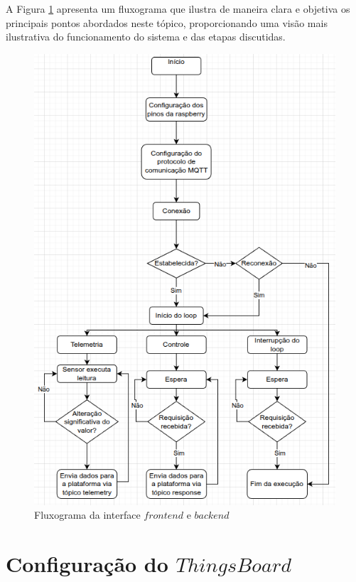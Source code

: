 \documentclass{ecatfg}
\begin{document}
A Figura \ref{fig:6} apresenta um fluxograma que ilustra de maneira clara e objetiva os principais pontos abordados neste tópico, proporcionando uma visão mais ilustrativa do funcionamento do sistema e das etapas discutidas. \par

\begin{figure}[!htb]
    \centering
    \includegraphics[scale=0.3]{Figuras/fluxograma_front_back.png}
    \caption{Fluxograma da interface $frontend$ e $backend$}
    \label{fig:6}
\end{figure}


\section{Configuração do $ThingsBoard$}
\end{document}
